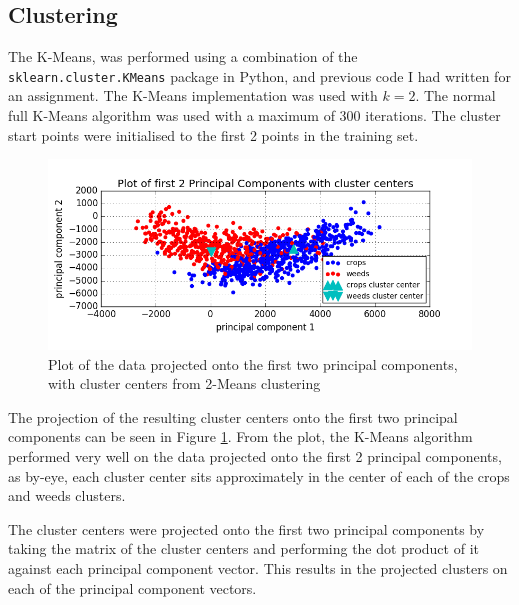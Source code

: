 \documentclass{scrartcl}
\begin{document}
\subsection{Clustering}

The K-Means, was performed using a combination of the \texttt{sklearn.cluster.KMeans} package in Python, and previous code I had written for an assignment. The K-Means implementation was used with $k = 2$. The normal full K-Means algorithm was used with a maximum of 300 iterations. The cluster start points were initialised to the first 2 points in the training set.\\

\begin{figure}[h]
\includegraphics[width=16cm]{2pc_cc.png}
\caption{Plot of the data projected onto the first two principal components, with cluster centers from 2-Means clustering}
\label{fig:2pc_cc}
\end{figure}

The projection of the resulting cluster centers onto the first two principal components can be seen in Figure \ref{fig:2pc_cc}. From the plot, the K-Means algorithm performed very well on the data projected onto the first 2 principal components, as by-eye, each cluster center sits approximately in the center of each of the crops and weeds clusters.

The cluster centers were projected onto the first two principal components by taking the matrix of the cluster centers and performing the dot product of it against each principal component vector. This results in the projected clusters on each of the principal component vectors.

\newpage
\printbibliography
\end{document}
